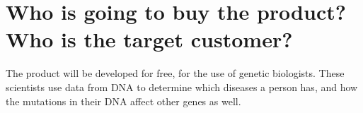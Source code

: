 \section{Who is going to buy the product? Who is the target customer?}
The product will be developed for free, for the use of genetic biologists. These scientists use data from DNA to determine which diseases a person has, and how the mutations in their DNA affect other genes as well.